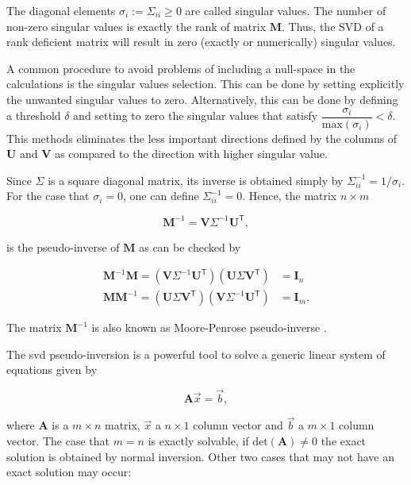 The diagonal elements $\sigma_i := \Sigma_{ii} \geq 0$ are called singular values. The number of non-zero singular values is exactly the rank of matrix $\mathbf{M}$. Thus, the SVD of a rank deficient matrix will result in zero (exactly or numerically) singular values. 

A common procedure to avoid problems of including a null-space in the calculations is the singular values selection. This can be done by setting explicitly the unwanted singular values to zero. Alternatively, this can be done by defining a threshold $\delta$ and setting to zero the singular values that satisfy $\dfrac{\sigma_i}{\mathrm{max}\left(\sigma_i\right)} < \delta$. This methods eliminates the less important directions defined by the columns of $\mathbf{U}$ and $\mathbf{V}$ as compared to the direction with higher singular value.

Since $\Sigma$ is a square diagonal matrix, its inverse is obtained simply by $\Sigma^{-1}_{ii} = 1/\sigma_{i}$. For the case that $\sigma_{i} = 0$, one can define $\Sigma^{-1}_{ii} = 0$. Hence, the matrix $n \times m$

\begin{equation}
    \mathbf{M}^{-1} = \mathbf{V} \Sigma^{-1} \mathbf{U}^{\mathsf{T}},
    \label{eq:svd_inverse}
\end{equation}

is the pseudo-inverse of $\mathbf{M}$ as can be checked by

\begin{align}
    \mathbf{M}^{-1}\mathbf{M} =  \left(\mathbf{V} \Sigma^{-1} \mathbf{U}^{\mathsf{T}} \right)\left(\mathbf{U} \Sigma \mathbf{V}^{\mathsf{T}}\right) &= \mathbf{I}_{n} \\
    \mathbf{M}\mathbf{M}^{-1} =  \left(\mathbf{U} \Sigma \mathbf{V}^{\mathsf{T}}\right)\left( \mathbf{V} \Sigma^{-1} \mathbf{U}^{\mathsf{T}} \right)&= \mathbf{I}_{m}. 
\end{align}

The matrix $\mathbf{M}^{-1}$ is also known as Moore-Penrose pseudo-inverse \cite{numerical_recipes}.

The \gls{svd} pseudo-inversion is a powerful tool to solve a generic linear system of equations given by

\begin{equation}
    \mathbf{A} \vec{x} = \vec{b},
    \label{eq:linear_system}
\end{equation}

where $\mathbf{A}$ is a $m \times n$ matrix, $\vec{x}$ a $n \times 1$ column vector and $\vec{b}$ a $m \times 1$ column vector. The case that $m=n$ is exactly solvable, if $\mathrm{det}\left(\mathbf{A}\right) \neq 0$ the exact solution is obtained by normal inversion. Other two cases that may not have an exact solution may occur:

